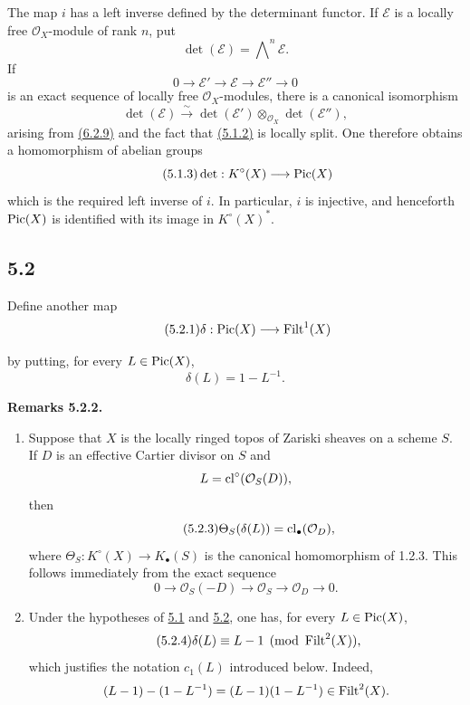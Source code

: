The map $i$ has a left inverse defined by the determinant functor. If
$\mathcal E$ is a locally free $\mathcal O_X$-module of rank $n$, put
\[
\det(\mathcal E)=\bigwedge\nolimits^n\mathcal E.
\]
If
\begin{equation}\tag{5.1.2}
0\longrightarrow\mathcal E'\longrightarrow\mathcal E
\longrightarrow\mathcal E''\longrightarrow0
\end{equation}
is an exact sequence of locally free $\mathcal O_X$-modules, there is a
canonical isomorphism
\[
\det(\mathcal E)\xrightarrow{\sim}
\det(\mathcal E')\otimes_{\mathcal O_X}\det(\mathcal E''),
\]
arising from \hyperlink{sga6.e10.eq.6-2-9}{(6.2.9)} and the fact that \hyperlink{sga6.e10.eq.5-1-2}{(5.1.2)} is locally split. One therefore
obtains a homomorphism of abelian groups
\begin{equation}\tag{5.1.3}
\det:K^\circ(X)\longrightarrow\operatorname{Pic}(X)
\end{equation}
which is the required left inverse of $i$. In particular, $i$ is injective,
and henceforth $\operatorname{Pic}(X)$ is identified with its image in $K^\circ(X)^*$.

\subsection*{5.2}
Define another map
\begin{equation}\tag{5.2.1}
\delta:\operatorname{Pic}(X)\longrightarrow\operatorname{Filt}^1(X)
\end{equation}

by putting, for every $L\in\operatorname{Pic}(X)$,
\[
\delta(L)=1-L^{-1}.
\]

\textbf{Remarks 5.2.2.}
\begin{enumerate}[label=\alph*)]
\item Suppose that $X$ is the locally ringed topos of Zariski sheaves on a
scheme $S$. If $D$ is an effective Cartier divisor on $S$ and
\[
L=\operatorname{cl}^\circ(\mathcal O_S(D)),
\]
then
\begin{equation}\tag{5.2.3}
\Theta_S(\delta(L))=\operatorname{cl}_\bullet(\mathcal O_D),
\end{equation}
where $\Theta_S:K^\circ(X)\to K_\bullet(S)$ is the canonical homomorphism of
1.2.3. This follows immediately from the exact sequence
\[
0\longrightarrow\mathcal O_S(-D)\longrightarrow\mathcal O_S
\longrightarrow\mathcal O_D\longrightarrow0.
\]

\item Under the hypotheses of \hyperlink{sga6.e10.sec.5.1}{5.1} and \hyperlink{sga6.e10.sec.5.2}{5.2}, one has, for every
$L\in\operatorname{Pic}(X)$,
\begin{equation}\tag{5.2.4}
\delta(L)\equiv L-1\pmod{\operatorname{Filt}^2(X)},
\end{equation}
which justifies the notation $c_1(L)$ introduced below. Indeed,
\[
(L-1)-(1-L^{-1})=(L-1)(1-L^{-1})\in\operatorname{Filt}^2(X).
\]
\end{enumerate}

